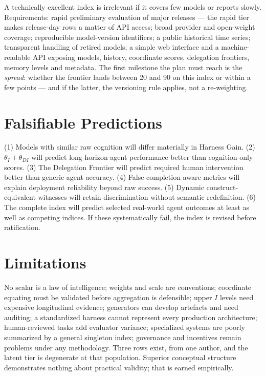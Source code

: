 \documentclass[11pt]{article}
\theoremstyle{definition}
\begin{document}
A technically excellent index is irrelevant if it covers few models or reports slowly. Requirements: rapid preliminary evaluation of major releases --- the rapid tier makes release-day rows a matter of API access; broad provider and open-weight coverage; reproducible model-version identifiers; a public historical time series; transparent handling of retired models; a simple web interface and a machine-readable API exposing models, history, coordinate scores, delegation frontiers, memory levels and metadata. The first milestone the plan must reach is the \emph{spread}: whether the frontier lands between 20 and 90 on this index or within a few points --- and if the latter, the versioning rule applies, not a re-weighting.

\section{Falsifiable Predictions}\label{sec:predictions}

(1) Models with similar raw cognition will differ materially in Harness Gain. (2) $\theta_I + \theta_{DI}$ will predict long-horizon agent performance better than cognition-only scores. (3) The Delegation Frontier will predict required human intervention better than generic agent accuracy. (4) False-completion-aware metrics will explain deployment reliability beyond raw success. (5) Dynamic construct-equivalent witnesses will retain discrimination without semantic redefinition. (6) The complete index will predict selected real-world agent outcomes at least as well as competing indices. If these systematically fail, the index is revised before ratification.

\section{Limitations}\label{sec:limits}

No scalar is a law of intelligence; weights and scale are conventions; coordinate equating must be validated before aggregation is defensible; upper $I$ levels need expensive longitudinal evidence; generators can develop artefacts and need auditing; a standardized harness cannot represent every production architecture; human-reviewed tasks add evaluator variance; specialized systems are poorly summarized by a general singleton index; governance and incentives remain problems under any methodology. Three rows exist, from one author, and the latent tier is degenerate at that population. Superior conceptual structure demonstrates nothing about practical validity; that is earned empirically.
\end{document}
